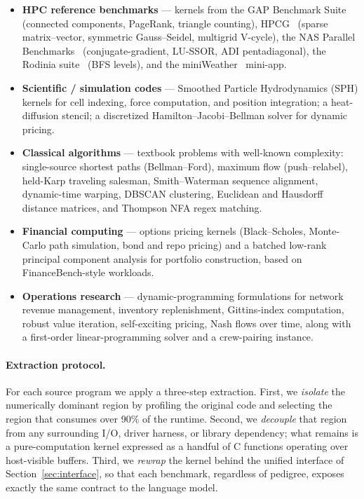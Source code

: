 \documentclass{article}
\begin{document}
\begin{itemize}
  \item \textbf{HPC reference benchmarks} — kernels from the GAP Benchmark
  Suite~\citep{gapbs} (connected components, PageRank, triangle
  counting), HPCG~\citep{hpcg} (sparse matrix--vector, symmetric
  Gauss--Seidel, multigrid V-cycle), the NAS Parallel Benchmarks~\citep{npb}
  (conjugate-gradient, LU-SSOR, ADI pentadiagonal), the Rodinia
  suite~\citep{rodinia} (BFS levels), and the
  miniWeather~\citep{miniweather} mini-app.
  \item \textbf{Scientific / simulation codes} — Smoothed Particle
  Hydrodynamics (SPH) kernels for cell indexing, force computation, and
  position integration; a heat-diffusion stencil; a discretized Hamilton--Jacobi--Bellman
  solver for dynamic pricing.
  \item \textbf{Classical algorithms} — textbook problems with well-known
  complexity: single-source shortest paths (Bellman--Ford), maximum flow
  (push--relabel), held-Karp traveling salesman, Smith--Waterman sequence
  alignment, dynamic-time warping, DBSCAN clustering, Euclidean and
  Hausdorff distance matrices, and Thompson NFA regex matching.
  \item \textbf{Financial computing} — options pricing kernels (Black--Scholes,
  Monte-Carlo path simulation, bond and repo pricing) and a batched
  low-rank principal component analysis for portfolio construction, based
  on FinanceBench-style workloads.
  \item \textbf{Operations research} — dynamic-programming formulations for
  network revenue management, inventory replenishment, Gittins-index
  computation, robust value iteration, self-exciting pricing, Nash flows
  over time, along with a first-order linear-programming solver and a
  crew-pairing instance.
\end{itemize}

\paragraph{Extraction protocol.}
For each source program we apply a three-step extraction. First, we
\emph{isolate} the numerically dominant region by profiling the original
code and selecting the region that consumes over 90\% of the runtime.
Second, we \emph{decouple} that region from any surrounding I/O, driver
harness, or library dependency; what remains is a pure-computation kernel
expressed as a handful of C functions operating over host-visible buffers.
Third, we \emph{rewrap} the kernel behind the unified interface of
Section~\ref{sec:interface}, so that each benchmark, regardless of
pedigree, exposes exactly the same contract to the language model.
\end{document}
